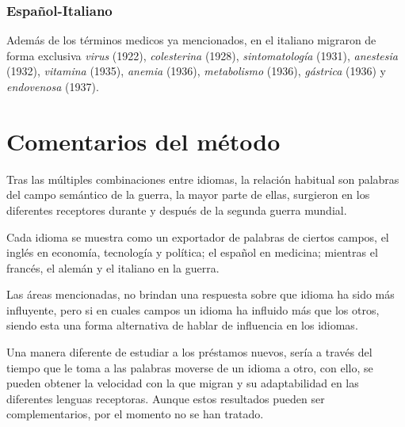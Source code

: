

\subsubsection*{Español-Italiano}%


Además de los términos medicos ya mencionados, en el italiano migraron de forma  exclusiva  \textit{virus} (1922), \textit{colesterina} (1928),  \textit{sintomatología} (1931), \textit{anestesia} (1932), \textit{vitamina} (1935), \textit{anemia} (1936), \textit{metabolismo} (1936),  \textit{gástrica} (1936)  y \textit{endovenosa} (1937).  







\section{Comentarios del método}%



Tras las múltiples combinaciones entre idiomas, la relación habitual son palabras del campo semántico de la guerra, la mayor parte de ellas, surgieron en los diferentes receptores durante y después de la segunda guerra mundial. 

Cada idioma se muestra como un exportador de palabras de ciertos campos,  el inglés en economía, tecnología y política; el español en medicina; mientras el francés, el alemán y el italiano en la guerra.  

Las áreas mencionadas, no brindan una respuesta sobre que idioma ha sido más influyente, pero si en cuales campos un idioma ha influido más que los otros, siendo esta una forma alternativa de hablar de influencia en los idiomas.
 
Una manera diferente de estudiar a los préstamos nuevos, sería a través del tiempo que le toma a las palabras moverse de un idioma a otro, con ello, se pueden obtener la velocidad con la que migran y su adaptabilidad en las diferentes lenguas receptoras. Aunque estos resultados pueden ser complementarios, por el momento no se han tratado. 


